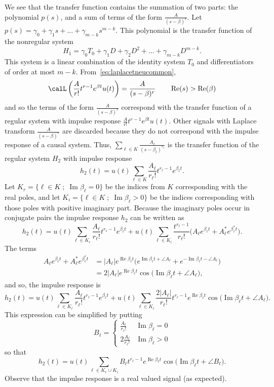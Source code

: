 \documentclass[11pt,a4paper]{book}
\theoremstyle{plain}
\numberwithin{equation}{section}
\renewcommand{\Re}{\operatorname{Re}}
\renewcommand{\Im}{\operatorname{Im}}
\renewcommand{\mid}{\; ; \;}
\newcommand{\abs}[1]{\left\vert #1 \right\vert}
\begin{document}
We see that the transfer function contains the summation of two parts: the polynomial $p(s)$, and a sum of terms of the form $\frac{A}{(s-\beta)^r}$.  Let $p(s) = \gamma_0 + \gamma_1 s + \dots + \gamma_{m-k}s^{m-k}$.  This polynomial is the transfer function of the nonregular system
\[
H_1 = \gamma_0 T_0 + \gamma_1 D + \gamma_2 D^2 + \dots + \gamma_{m-k} D^{m-k}.
\]
This system is a linear combination of the identity system $T_0$ and differentiators of order at most $m-k$.  From~\eqref{eq:laplacetneucommon},
\[
\calL\left( \frac{A}{r!} t^{r-1} e^{\beta t} u(t) \right) = \frac{A}{(s-\beta)^{r}} \qquad \Re(s) > \Re(\beta)
\]
and so the terms of the form $\frac{A}{(s-\beta)^r}$ correspond with the transfer function of a regular system with impulse response $\frac{A}{r!} t^{r-1} e^{\beta t} u(t)$.  Other signals with Laplace transform $\frac{A}{(s-\beta)^{r}}$ are discarded because they do not correspond with the impulse response of a causal system.  Thus, $\sum_{\ell \in K} \frac{A_\ell}{(s - \beta_\ell)^{r_\ell}}$ is the transfer function of the regular system $H_2$ with impulse response 
\[
h_2(t) = u(t) \sum_{\ell\in K} \frac{A_\ell}{r_\ell!} t^{r_\ell-1} e^{\beta_\ell t}.
\]
Let $K_r = \{\ell \in K \mid \Im\beta_\ell = 0\}$ be the indices from $K$ corresponding with the real poles, and let $K_i=\{\ell \in K \mid \Im\beta_\ell > 0\}$ be the indices corresponding with those poles with positive imaginary part.  Because the imaginary poles occur in conjugate pairs the impulse response $h_2$ can be written as
\[
h_2(t) = u(t) \sum_{\ell\in K_r} \frac{A_\ell}{r_\ell!} t^{r_\ell-1} e^{\beta_\ell t} + u(t) \sum_{\ell\in K_i} \frac{t^{r_\ell-1}}{r_\ell!}  \big( A_\ell e^{\beta_\ell t} + A_\ell^* e^{\beta_\ell^* t} \big).
\]
The terms
\begin{align*}
A_\ell e^{\beta_\ell t} + A_\ell^* e^{\beta_\ell^* t}  &= \abs{A_\ell} e^{\Re\beta_\ell t} \big( e^{\Im\beta_\ell t + \angle A_\ell} + e^{-\Im\beta_\ell t - \angle A_\ell}\big) \\
&= 2 \abs{A_\ell} e^{\Re\beta_\ell t} \cos\big(\Im\beta_\ell t + \angle A_\ell\big),
\end{align*}
and so, the impulse response is
\[
h_2(t) = u(t) \sum_{\ell\in K_r} \frac{A_\ell}{r_\ell!} t^{r_\ell-1} e^{\beta_\ell t} + u(t) \sum_{\ell\in K_i} \frac{2\abs{A_\ell}}{r_\ell!}  t^{r_\ell-1} e^{\Re\beta_\ell t} \cos\big(\Im\beta_\ell t + \angle A_\ell\big).
\]
This expression can be simplified by putting
\[
B_\ell = \begin{cases} 
\tfrac{A_\ell}{r_\ell!} & \Im\beta_\ell = 0 \\
2\tfrac{A_\ell}{r_\ell!} & \Im\beta_\ell > 0
\end{cases}
\]
so that
\begin{equation}\label{eq:H2implrespcleanedup}
h_2(t) = u(t) \sum_{\ell\in K_r \cup K_i} B_\ell t^{r_\ell-1} e^{\Re{\beta_\ell} t} \cos\big( \Im \beta_\ell t + \angle B_\ell \big).
\end{equation}
Observe that the impulse response is a real valued signal (as expected).
\end{document}
